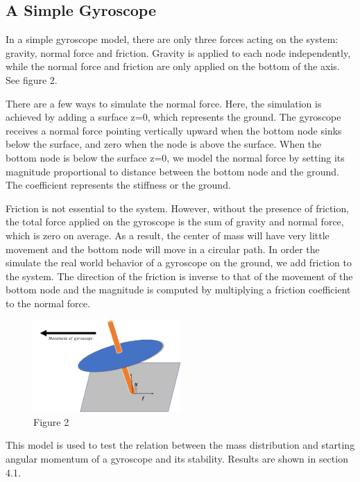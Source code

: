 \documentclass[12pt]{article}
\renewcommand{\(}{\left (}
\renewcommand{\)}{\right )}
\begin{document}
\subsection{A Simple Gyroscope}
\hspace{5mm} In a simple gyroscope model, there are only three forces acting on the system: gravity, normal force and friction.
Gravity is applied to each node independently, while the normal force and friction are only applied on the bottom of the axis. See figure 2.

There are a few ways to simulate the normal force. Here, the simulation is achieved by adding a surface z=0, which represents the ground. The gyroscope receives a normal force pointing vertically upward when the bottom node sinks below the surface, and zero when the node is above the surface. When the bottom node is below the surface z=0, we model the normal force by setting its magnitude proportional to distance between the bottom node and the ground. The coefficient represents the stiffness or the ground.

Friction is not essential to the system. However, without the presence of friction, the total force applied on the gyroscope is the sum of gravity and normal force, which is zero on average. As a result, the center of mass will have very little movement and the bottom node will move in a circular path. In order the simulate the real world behavior of a gyroscope on the ground, we add friction to the system. The direction of the friction is inverse to that of the movement of the bottom node and the magnitude is computed by multiplying a friction coefficient to the normal force.
\begin {figure}[ht]
	\centering
    \includegraphics[width=0.5\textwidth]{1st_model.png}
    \caption*{\small Figure 2}
\end {figure}

This model is used to test the relation between the mass distribution and starting angular momentum of a gyroscope and its stability. Results are shown in section 4.1.
\end{document}
